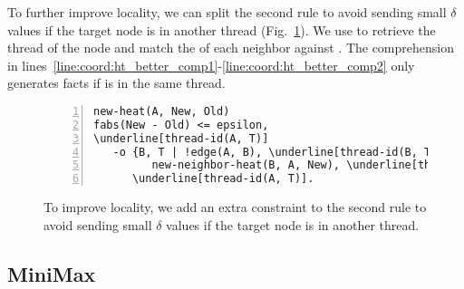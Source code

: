 \iffalse
Fig.~\ref{results:ht} presents the scalability results for the regular
and coordinated version. The dataset used is a square grid with an inner square
with high heat nodes. Comparing the coordinated version with the regular
version, with 1 thread there is a 50\% reduction in run time, while
for 16 threads there is, on average, a 25\% reduction.
\fi

To further improve locality, we can split the second rule to avoid sending small
$\delta$ values if the target node is in another thread
(Fig.~\ref{code:coord:ht_better}). We use  to retrieve the
thread  of the node  and match the  of each
neighbor  against . The comprehension in
lines~\ref{line:coord:ht_better_comp1}-\ref{line:coord:ht_better_comp2} only
generates  facts if  is in the same thread.

\iffalse
The \textbf{C/Local} line in
Fig.~\ref{results:ht} shows that this performs best.  However, this comes at
the price of increased errors in the computed heat values.
\fi

\begin{figure}[h!]
\begin{Verbatim}[numbers=left,fontsize=\codesize,commandchars=\\\[\]]
new-heat(A, New, Old)
fabs(New - Old) <= epsilon,
\underline[thread-id(A, T)]
   -o {B, T | !edge(A, B), \underline[thread-id(B, T)] |\label[line:coord:ht_better_comp1]
         new-neighbor-heat(B, A, New), \underline[thread-id(B, T)]},\label[line:coord:ht_better_comp2]
      \underline[thread-id(A, T)].
\end{Verbatim}

  \caption{To improve locality, we add an extra constraint to the second rule to
     avoid sending small $\delta$ values if the target node is in another thread.}
  \label{code:coord:ht_better}
\end{figure}

\subsection{MiniMax}\label{section:coord:minimax}

